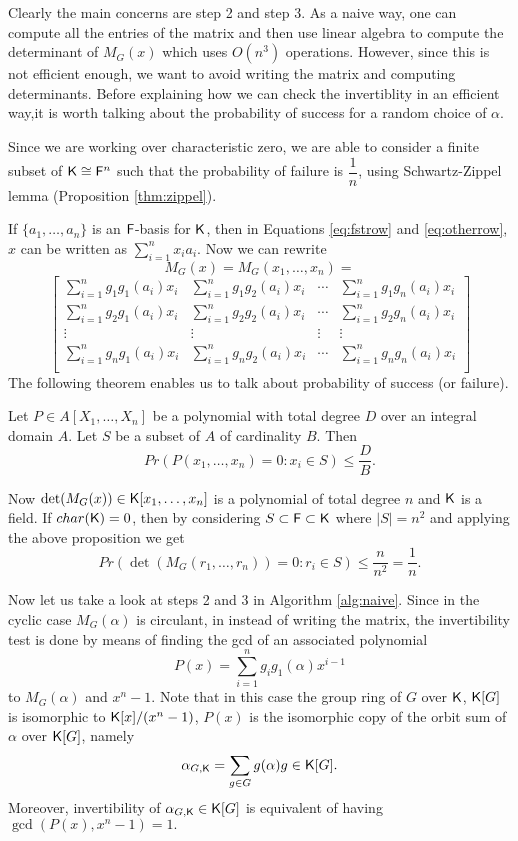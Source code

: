  Clearly the main concerns are step 2 and step 3. As a naive way, one can compute all the entries of the matrix and then 
 use linear algebra to compute the determinant of $M_G(x)$ which uses $O(n^3)$ operations. However, since this is not efficient
 enough, we want to avoid writing the matrix and computing determinants. Before explaining how we can check the invertiblity 
 in an efficient way,it is worth talking about the probability of success for a random choice of $\alpha$.
 
 Since we are working over characteristic zero, we are able to consider a finite subset
 of ${\mathsf{K}} \cong {\mathsf{F}}^n$ such that the probability of failure is $\dfrac{1}{n}$, using 
 Schwartz-Zippel lemma (Proposition \ref{thm:zippel}).
 
 If $\lbrace a_1, \ldots , a_n \rbrace$ is an ${\mathsf{F}}$-basis for ${\mathsf{K}}$, then in Equations
   \ref{eq:fstrow} and \ref{eq:otherrow}, $x$ can be written as $\sum_{i = 1}^nx_i
    a_i$. Now we can rewrite 
    $$
M_G(x) = M_G(x_1,\ldots,x_n) =  $$
$$
\begin{bmatrix}
\sum_{i = 1}^n g_1 g_1(a_i)x_i & \sum_{i = 1}^n g_1 g_2(a_i)x_i & \cdots & 
\sum_{i = 1}^n g_1 g_n(a_i)x_i \\
\sum_{i = 1}^n g_2 g_1(a_i)x_i & \sum_{i = 1}^n g_2 g_2(a_i)x_i & \cdots & 
\sum_{i = 1}^n g_2 g_n(a_i)x_i \\
\vdots		& \vdots	& \vdots & \vdots \\
\sum_{i = 1}^n g_n g_1(a_i)x_i & \sum_{i = 1}^n g_n g_2(a_i)x_i & \cdots & 
\sum_{i = 1}^n g_n g_n(a_i)x_i \\
\end{bmatrix}    
    $$ 
 The following theorem enables us to talk about probability of success (or failure).
 \begin{proposition}\cite[Proposition 98]{Zippel} \label{thm:zippel}
Let $P \in A[X_1, \ldots, X_n]$ be a polynomial with total degree $D$ over an integral domain $A$. Let $S$ be a subset of $A$ of cardinality $B$. Then $$Pr(P(x_1, \ldots , x_n)=0:x_i \in S) \leq \dfrac{D}{B}.$$
\end{proposition}

Now $\det(M_G(x)) \in {\mathsf{K}}[x_1, \ldots , x_n]$ is a polynomial of total degree $n$ and ${\mathsf{K}}$ is a field. If $char({\mathsf{K}}) =0$, then by considering $S \subset {\mathsf{F}} \subset {\mathsf{K}}$ where $|S| = n^2$ and applying the above proposition we get $$Pr(\det(M_G(r_1,\ldots , r_n)) = 0 : r_i \in S)\leq \dfrac{n}{n^2}= \dfrac{1}{n}.$$
 
Now let us take a look at steps 2 and 3 in Algorithm \ref{alg:naive}. Since in the cyclic case $M_G(\alpha)$ is circulant,
 in \cite{Giesbrecht} instead of writing the matrix, the invertibility test is done by means of finding the gcd of an 
 associated polynomial 
$$P(x) = \sum_{i = 1}^n g_ig_1(\alpha)x^{i-1}$$ 
 to $M_G(\alpha)$ and $x^n-1$. Note that in this case the group ring of $G$ over ${\mathsf{K}}$, ${\mathsf{K}}[G]$ is isomorphic to ${\mathsf{K}}[x]/(x^n-1)$,
 $P(x)$ is the isomorphic copy of the orbit sum of $\alpha$ over ${\mathsf{K}}[G]$, namely
 $$\alpha_{G,{\mathsf{K}}} = \sum_{g \in G} g(\alpha)g \in {\mathsf{K}}[G].$$
 Moreover, invertibility of $\alpha_{G,{\mathsf{K}}}\in {\mathsf{K}}[G]$ is equivalent of having $\gcd (P(x),x^n-1) =1.$
 

